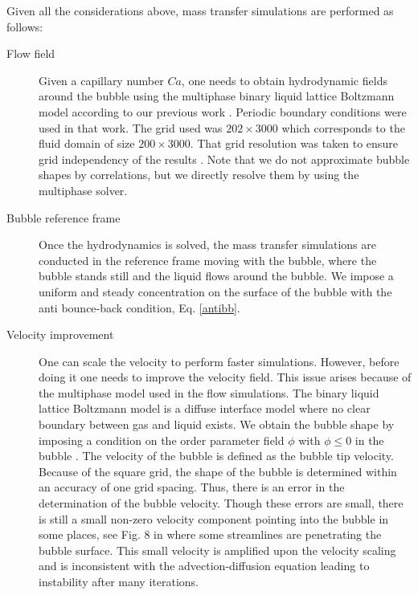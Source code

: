\documentclass[review,12pt]{elsarticle}
\begin{document}
Given all the considerations above, mass transfer simulations are performed as follows:
\begin{description}
 \item[Flow field] Given a capillary number $Ca$, one needs to obtain hydrodynamic fields around
the bubble using the multiphase binary liquid lattice Boltzmann model according to our previous work
\cite{kuzmin-binary2d}. Periodic boundary conditions were used in that work. The grid used  was
$202\times 3000$ which corresponds to the fluid domain  of size $200\times3000$. That grid resolution was
taken to ensure grid
independency of the results \cite{kuzmin-binary2d}. Note that we do not approximate bubble shapes by correlations, but we directly resolve them by using the multiphase solver. 
 \item[Bubble reference frame] Once the hydrodynamics is solved, the mass transfer simulations
are conducted in the reference frame moving with the bubble, where the bubble stands still and the liquid
flows around the
bubble. We impose a uniform and steady concentration on the surface
of the bubble with the anti bounce-back condition, Eq. \ref{antibb}.
 \item[Velocity improvement] One can scale the velocity to
perform faster simulations. However, before doing it one needs to improve the velocity field.
This issue arises because of the
multiphase model used in the flow simulations. The binary liquid lattice Boltzmann model is a diffuse
interface model where no clear boundary between gas and liquid exists.
We obtain the bubble shape by imposing a condition on the order parameter field $\phi$ with $\phi\leq0$ in the bubble \cite{kuzmin-binary2d}. The velocity of the
bubble is defined as the bubble tip velocity. Because of the square grid, the shape of the bubble is determined within an accuracy of one grid spacing. Thus,
there is an error in the determination of the bubble velocity. Though these errors are small,
there is still a small non-zero velocity component pointing into the bubble in some places, see Fig. 8 in
\cite{kuzmin-binary2d} where some streamlines are penetrating the bubble surface.
This small velocity is amplified upon the velocity scaling and is inconsistent with the
advection-diffusion equation leading to instability after many iterations.


\end{description}
\end{document}
